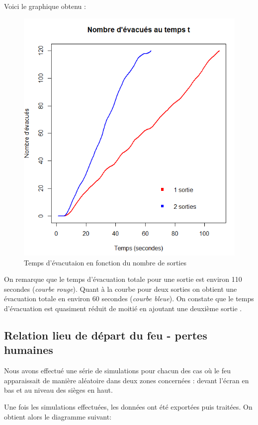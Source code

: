 \documentclass{article}
\begin{document}
Voici le graphique obtenu :
\begin{figure}[H]
	\includegraphics[scale=0.35]{nb_sortie.PNG}
  \centering
	\caption{Temps d'évacutaion en fonction du nombre de sorties}
 	\label{pic: nb_sortie}
\end{figure}

On remarque que le temps d'évacuation totale pour une sortie est environ 110 secondes ({\it courbe rouge}). Quant à la courbe pour deux sorties on obtient une évacuation totale en environ 60 secondes ({\it courbe bleue}).
On constate que le temps d'évacuation est quasiment réduit de moitié en ajoutant une deuxième sortie .

\subsection{Relation lieu de départ du feu - pertes humaines}
Nous avons effectué une série de simulations pour chacun des cas où le feu apparaissait de manière aléatoire dans deux zones concernées : devant l'écran en bas et au niveau des sièges en haut.

Une fois les simulations effectuées, les données ont été exportées puis traitées. On obtient alors le diagramme suivant:
\end{document}
